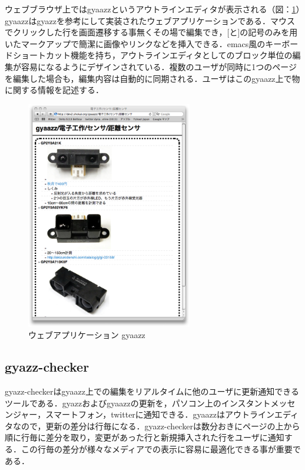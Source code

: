ウェブブラウザ上ではgyaazzというアウトラインエディタが表示される（図：\ref{fig:gyaazz}）gyaazzはgyazz\cite{gyazz}を参考にして実装されたウェブアプリケーションである．マウスでクリックした行を画面遷移する事無くその場で編集でき，[と]の記号のみを用いたマークアップで簡潔に画像やリンクなどを挿入できる．emacs風のキーボードショートカット機能を持ち，アウトラインエディタとしてのブロック単位の編集が容易になるようにデザインされている．複数のユーザが同時に1つのページを編集した場合も，編集内容は自動的に同期される．ユーザはこのgyaazz上で物に関する情報を記述する．

\begin{figure}
  \begin{center}
    \includegraphics[height=100mm]{img/gyaazz.png}
  \end{center}
  \caption{ウェブアプリケーション gyaazz}
  \label{fig:gyaazz}
\end{figure}

\subsection{gyazz-checker}

gyazz-checkerはgyaazz上での編集をリアルタイムに他のユーザに更新通知できるツールである．gyazzおよびgyaazzの更新を，パソコン上のインスタントメッセンジャー，スマートフォン，twitterに通知できる．gyaazzはアウトラインエディタなので，更新の差分は行毎になる．gyazz-checkerは数分おきにページの上から順に行毎に差分を取り，変更があった行と新規挿入された行をユーザに通知する．この行毎の差分が様々なメディアでの表示に容易に最適化できる事が重要である．

